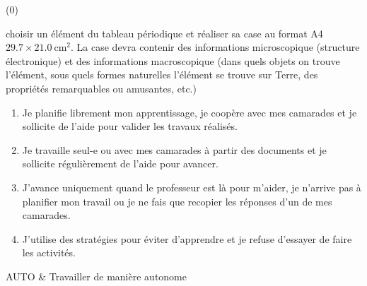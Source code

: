 \vspace*{-354 pt}

\begin{programmeSeance}
\end{programmeSeance}

\begin{programmeSeance}
\end{programmeSeance}

\begin{programmeSeance}[2](0)
\end{programmeSeance}


\begin{tacheFinale}
   choisir un élément du tableau périodique et réaliser sa case au format A4 $\num{29,7} \times\qty{21,0}{\cm\squared}$.
  La case devra contenir des informations microscopique (structure électronique) et des informations macroscopique (dans quels objets on trouve l'élément, sous quels formes naturelles l'élément se trouve sur Terre, des propriétés remarquables ou amusantes, etc.)
\end{tacheFinale}




\begin{enumerate}[label = \Alph*]
  \item Je planifie librement mon apprentissage, je coopère avec mes camarades et je sollicite de l'aide pour valider les travaux réalisés.
  \item Je travaille seul-e ou avec mes camarades à partir des documents et je sollicite régulièrement de l'aide pour avancer.
  \item J'avance uniquement quand le professeur est là pour m'aider, je n'arrive pas à planifier mon travail ou je ne fais que recopier les réponses d'un de mes camarades.
  \item J'utilise des stratégies pour éviter d'apprendre et je refuse d'essayer de faire les activités.
\end{enumerate}

\begin{tableauCompetences}
  AUTO & Travailler de manière autonome \\
\end{tableauCompetences}